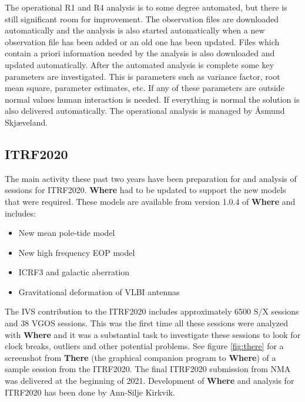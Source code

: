 \documentclass[twocolumn,twoside]{svmultivs_br} %
\begin{document}
The operational R1 and R4 analysis is to some degree automated, but there is still significant room for improvement. 
The observation files are downloaded automatically and the analysis is also started automatically when a new observation
file has been added or an old one has been updated. Files which contain a priori information needed by the analysis is
also downloaded and updated automatically. After the automated analysis is complete some key parameters are investigated.
This is parameters such as variance factor, root mean square, parameter estimates, etc. If any of these parameters are
outside normal values human interaction is needed. If everything is normal the solution is also delivered automatically.
The operational analysis is managed by \AA smund Skj\ae veland.

\subsection{ITRF2020}

The main activity these past two years have been preparation for and analysis of sessions for ITRF2020. \textbf{Where} had
to be updated to support the new models that were required. These models are available from version 1.0.4 of \textbf{Where}
and includes:

\begin{itemize}
  \item New mean pole-tide model
  \item New high frequency EOP model
  \item ICRF3 and galactic aberration
  \item Gravitational deformation of VLBI antennas
\end{itemize}

The IVS contribution to the ITRF2020 includes approximately 6500 S/X sessions and 38 VGOS sessions. This was the first
time all these sessions were analyzed with \textbf{Where} and it was a substantial task to investigate these sessions
to look for clock breaks, outliers and other potential problems. See figure \ref{fig:there} for a screenshot from 
\textbf{There} (the graphical companion program to \textbf{Where}) of a sample
session from the ITRF2020. The final ITRF2020 submission from NMA was delivered at
the beginning of 2021. Development of \textbf{Where} and analysis for ITRF2020 has been done by Ann-Silje Kirkvik.
\end{document}
